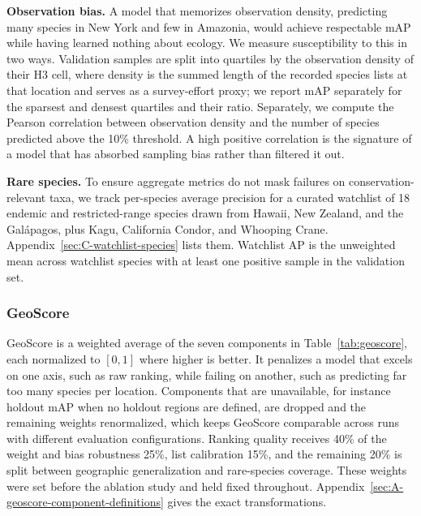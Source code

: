 \textbf{Observation bias.} A model that memorizes observation density, predicting many species in New York and few in Amazonia, would achieve respectable mAP while having learned nothing about ecology. We measure susceptibility to this in two ways. Validation samples are split into quartiles by the observation density of their H3 cell, where density is the summed length of the recorded species lists at that location and serves as a survey-effort proxy; we report mAP separately for the sparsest and densest quartiles and their ratio. Separately, we compute the Pearson correlation between observation density and the number of species predicted above the 10\% threshold. A high positive correlation is the signature of a model that has absorbed sampling bias rather than filtered it out.

\textbf{Rare species.} To ensure aggregate metrics do not mask failures on conservation-relevant taxa, we track per-species average precision for a curated watchlist of 18 endemic and restricted-range species drawn from Hawaii, New Zealand, and the Galápagos, plus Kagu, California Condor, and Whooping Crane. Appendix~\ref{sec:C-watchlist-species} lists them. Watchlist AP is the unweighted mean across watchlist species with at least one positive sample in the validation set.

\subsubsection{GeoScore}
\label{sec:geoscore}

GeoScore is a weighted average of the seven components in Table~\ref{tab:geoscore}, each normalized to $[0, 1]$ where higher is better. It penalizes a model that excels on one axis, such as raw ranking, while failing on another, such as predicting far too many species per location. Components that are unavailable, for instance holdout mAP when no holdout regions are defined, are dropped and the remaining weights renormalized, which keeps GeoScore comparable across runs with different evaluation configurations. Ranking quality receives 40\% of the weight and bias robustness 25\%, list calibration 15\%, and the remaining 20\% is split between geographic generalization and rare-species coverage. These weights were set before the ablation study and held fixed throughout. Appendix~\ref{sec:A-geoscore-component-definitions} gives the exact transformations.


